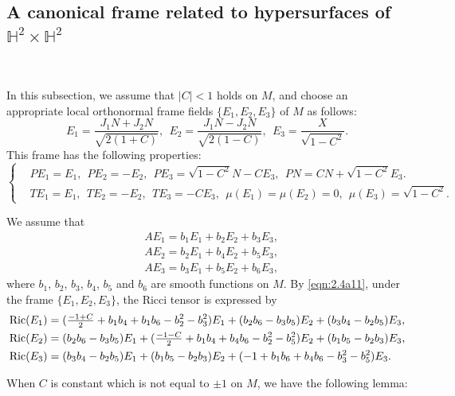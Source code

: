 \documentclass[reqno]{amsart}%
\theoremstyle{definition}
\numberwithin{equation}{section}
\begin{document}
\subsection{A canonical frame related to hypersurfaces of
$\mathbb{H}^2\times\mathbb{H}^2$}\label{sect:2.3}~

In this subsection, we assume that $|C|< 1$ holds on $M$,
and choose an appropriate local orthonormal frame fields $\{E_1, E_2, E_3\}$
of $M$ as follows:
%
\begin{equation}\label{eqn:2.5}
E_1=\frac{J_1N+J_2 N}{\sqrt{2(1+C)}},\
\ E_2=\frac{J_1N-J_2 N}{\sqrt{2(1-C)}},\ \ E_3=\frac{X}{\sqrt{1-C^{2}}}.
\end{equation}
%
This frame has the following properties:
%
\begin{equation}\label{eqn:2.6}
\left\{
\begin{aligned}
&P E_1=E_1,\ \ P E_2=-E_2,\ \ P E_3=\sqrt{1-C^{2}}N-C E_3,\ \ PN=CN+\sqrt{1-C^{2}}E_3.\\
&TE_1=E_1,\ \ TE_2=-E_2,\ \ TE_3=-CE_3,\ \ \mu(E_1)=\mu(E_2)=0,\ \ \mu(E_3)=\sqrt{1-C^{2}}.
\end{aligned}\right.
\end{equation}

We assume that
%
\begin{equation}\label{eqn:2.7}
\begin{aligned}	
&A E_1=b_1 E_1+b_2 E_2+b_3 E_3, \\
&A E_2=b_2 E_1+b_4 E_2+b_5 E_3,\\
&A E_3=b_3 E_1+b_5E_2+b_6 E_3,
\end{aligned}
\end{equation}
%
where $b_1$, $b_2$, $b_3$, $b_4$, $b_5$ and $b_6$ are smooth
functions on $M$. 
By \eqref{eqn:2.4a11}, under the frame $\{E_1,E_2,E_3\}$, the Ricci tensor is expressed by
%
\begin{equation}\label{eqn:2.8a1212}
\begin{aligned}
&{\rm Ric}(E_1)=(\tfrac{-1+C}{2}
+b_1b_4+b_1b_6-b_2^{2}-b_3^{2}) E_1+
(b_2b_6-b_3 b_5) E_2+(b_3b_4-b_2b_5) E_3, \\
&{\rm Ric}(E_2)=(b_2b_6-b_3 b_5) E_1
+(\tfrac{-1-C}{2}+b_1b_4+b_4b_6-b_2^{2}-b_5^{2}) E_2+(b_1b_5-b_2b_3) E_3,\\
&{\rm Ric}(E_3)=(b_3b_4-b_2b_5) E_1+(b_1b_5-b_2b_3) E_2+(-1+b_1b_6+b_4b_6-b_3^{2}-b_5^{2}) E_3.
\end{aligned}
\end{equation}
%	

When $C$ is constant which is not equal to $\pm1$ on $M$, we have the following lemma:
\end{document}
